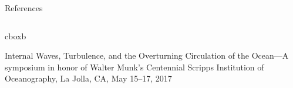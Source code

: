 \documentclass[final]{beamer}
\begin{document}
\begin{frame}[t]
\begin{columns}[t]
\begin{column}{0.55\textwidth}
\begin{columns}
\begin{column}{0.475\textwidth}
\begin{block}{References}
                          \end{block}

                      \end{column}

                      \end{columns}
    \end{column}
 \end{columns}

 \hspace{1cm}
 \vspace{-1.5cm}
   \hspace{0.5in}\begin{beamercolorbox}[wd=46.15in,colsep=0.15cm]{cboxb}\end{beamercolorbox}
   \vspace{-.9cm}
 \begin{flushleft}
\hskip1.92cm  Internal Waves, Turbulence, and the Overturning Circulation of the Ocean---A
 symposium in honor of Walter Munk's Centennial \hskip15.03cm
 Scripps Institution of Oceanography, La Jolla, CA, May 15--17, 2017
 \end{flushleft}

\end{frame}
\end{document}
